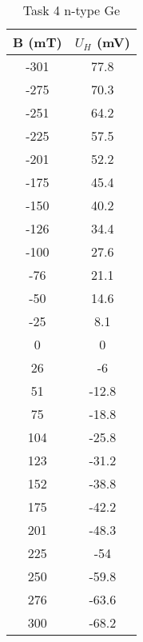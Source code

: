 \documentclass[11pt]{article}
\begin{document}
	\begin{table}[htbp]
		\centering
		\caption{Task 4 n-type Ge}
		\begin{tabular}{cc}
			\toprule
			B (mT) & $U_H$ (mV) \\
			\midrule
			-301 & 77.8 \\
			-275 & 70.3 \\
			-251 & 64.2 \\
			-225 & 57.5 \\
			-201 & 52.2 \\
			-175 & 45.4 \\
			-150 & 40.2 \\
			-126 & 34.4 \\
			-100 & 27.6 \\
			-76 & 21.1 \\
			-50 & 14.6 \\
			-25 & 8.1 \\
			0 & 0 \\
			26 & -6 \\
			51 & -12.8 \\
			75 & -18.8 \\
			104 & -25.8 \\
			123 & -31.2 \\
			152 & -38.8 \\
			175 & -42.2 \\
			201 & -48.3 \\
			225 & -54 \\
			250 & -59.8 \\
			276 & -63.6 \\
			300 & -68.2 \\
			\bottomrule
		\end{tabular}%
		\label{tab:8}%
	\end{table}%
	
\end{document}
